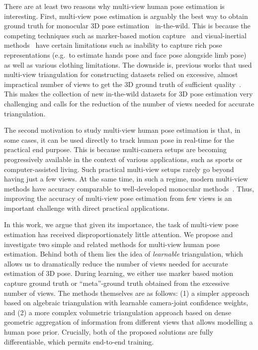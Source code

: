 \documentclass[10pt,twocolumn,letterpaper]{article}
\begin{document}
There are at least two reasons why multi-view human pose estimation is interesting. First, multi-view pose estimation is arguably the best way to obtain ground truth for monocular 3D pose estimation~\cite{Joo_2017_TPAMI, yu2018humbi} in-the-wild. This is because the competing techniques such as marker-based motion capture~\cite{moeslund2006survey} and visual-inertial methods~\cite{von2016human} have certain limitations such as inability to capture rich pose representations (e.g.\ to estimate hands pose and face pose alongside limb pose) as well as various clothing limitations. The downside is, previous works that used multi-view triangulation for constructing datasets relied on excessive, almost impractical number of views to get the 3D ground truth of sufficient quality~\cite{Joo_2017_TPAMI, yu2018humbi}. This makes the collection of new in-the-wild datasets for 3D pose estimation very challenging and calls for the reduction of the number of views needed for accurate triangulation.

The second motivation to study multi-view human pose estimation is that, in some cases, it can be used directly to track human pose in real-time for the practical end purpose. This is because multi-camera setups are becoming progressively available in the context of various applications, such as sports or computer-assisted living. Such practical multi-view setups rarely go beyond having just a few views. At the same time, in such a regime, modern multi-view methods have accuracy comparable to well-developed monocular methods~\cite{Tome2018, Pavlakos2017, Kadkhodamohammadi2018,sun2018integral, pavllo:videopose3d:2018}. Thus, improving the accuracy of multi-view pose estimation from few views is an important challenge with direct practical applications.

In this work, we argue that given its importance, the task of multi-view pose estimation has received disproportionately little attention. We propose and investigate two simple and related methods for multi-view human pose estimation. Behind both of them lies the idea of \textit{learnable} triangulation, which allows us to dramatically reduce the number of views needed for accurate estimation of 3D pose. During learning, we either use marker based motion capture ground truth or ``meta''-ground truth obtained from the excessive number of views. The methods themselves are as follows: (1) a simpler approach based on algebraic triangulation with learnable camera-joint confidence weights, and (2) a more complex volumetric triangulation approach based on dense geometric aggregation of information from different views that allows modelling a human pose prior. Crucially, both of the proposed solutions are fully differentiable, which permits end-to-end training.
\end{document}
